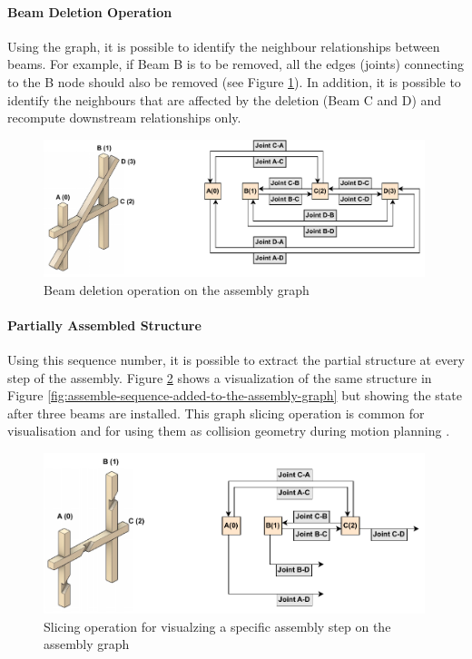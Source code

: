 \FloatBarrier

\paragraph{Beam Deletion Operation}

Using the graph, it is possible to identify the neighbour relationships between beams. For example, if Beam B is to be removed, all the edges (joints) connecting to the B node should also be removed (see Figure \ref{fig:assembly-graph-deletion}). In addition, it is possible to identify the neighbours that are affected by the deletion (Beam C and D) and recompute downstream relationships only. 

\begin{figure}[!h]
    \centering
    \includegraphics[width=0.99\textwidth]{images/05/image103.pdf}
    \caption{Beam deletion operation on the assembly graph}
    \label{fig:assembly-graph-deletion}
\end{figure}

\FloatBarrier

\paragraph{Partially Assembled Structure}

Using this sequence number, it is possible to extract the partial structure at every step of the assembly. Figure \ref{fig:assembly-graph-slice-at-step} shows a visualization of the same structure in Figure \ref{fig:assemble-sequence-added-to-the-assembly-graph} but showing the state after three beams are installed. This graph slicing operation is common for visualisation  and for using them as collision geometry during motion planning .

\begin{figure}[!h]
    \centering
    \includegraphics[width=0.99\textwidth]{images/05/image14.pdf}
    \caption{Slicing operation for visualzing a specific assembly step on the assembly graph}
    \label{fig:assembly-graph-slice-at-step}
\end{figure}

